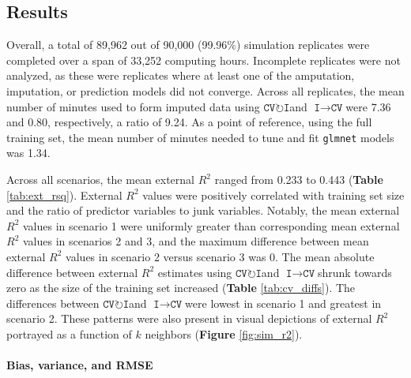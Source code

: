 \documentclass[AMA,STIX1COL,doublespace]{WileyNJD-v2}
\begin{document}
\subsection{Results} \label{subsec:sim_results}

Overall, a total of 89,962 out of 90,000 (99.96\%) simulation replicates
were completed over a span of 33,252 computing hours. Incomplete
replicates were not analyzed, as these were replicates where at least
one of the amputation, imputation, or prediction models did not
converge. Across all replicates, the mean number of minutes used to form
imputed data using
$\texttt{CV}\!\circlearrowright\!\texttt{I}$\space and
$\texttt{I}\!\!\rightarrow\!\texttt{CV}$\space were 7.36 and 0.80,
respectively, a ratio of 9.24. As a point of reference, using the full
training set, the mean number of minutes needed to tune and fit
\texttt{glmnet} models was 1.34.

Across all scenarios, the mean external \(R^2\) ranged from 0.233 to
0.443 (\textbf{Table} \ref{tab:ext_rsq}). External \(R^2\) values were
positively correlated with training set size and the ratio of predictor
variables to junk variables. Notably, the mean external \(R^2\) values
in scenario 1 were uniformly greater than corresponding mean external
\(R^2\) values in scenarios 2 and 3, and the maximum difference between
mean external \(R^2\) values in scenario 2 versus scenario 3 was 0. The
mean absolute difference between external \(R^2\) estimates using
$\texttt{CV}\!\circlearrowright\!\texttt{I}$\space and
$\texttt{I}\!\!\rightarrow\!\texttt{CV}$\space shrunk towards zero as
the size of the training set increased (\textbf{Table}
\ref{tab:cv_diffs}). The differences between
$\texttt{CV}\!\circlearrowright\!\texttt{I}$\space and
$\texttt{I}\!\!\rightarrow\!\texttt{CV}$\space were lowest in scenario 1
and greatest in scenario 2. These patterns were also present in visual
depictions of external \(R^2\) portrayed as a function of \(k\)
neighbors (\textbf{Figure} \ref{fig:sim_r2}).

\paragraph{Bias, variance, and RMSE}
\end{document}
